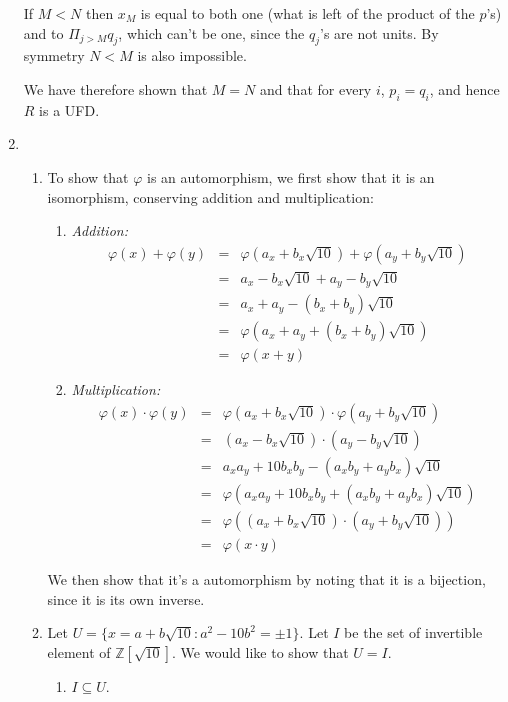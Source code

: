\documentclass[11pt]{article} \usepackage{amssymb}
\newcommand{\Z}{\mathbb Z} \newcommand{\CalE}{{\mathcal{E}}}
\renewcommand{\phi}{\varphi}
\begin{document}
\begin{enumerate}
    If $M<N$ then $x_M$ is equal to both one (what is left of the product
    of the $p$'s) and to $\Pi_{j>M}q_j$, which can't be one, since the $q_j$'s 
    are not units. By symmetry $N<M$ is also impossible.

    We have therefore shown that $M=N$ and that for every $i$, $p_i=q_i$, and
    hence $R$ is a UFD.

  \item
    \begin{enumerate}
      \item To show that $\phi$ is an automorphism, we first show that it
        is an isomorphism,
        conserving addition and multiplication:
        \begin{enumerate}
          \item {\em Addition:} 
            \begin{eqnarray*}
              \phi(x)+\phi(y)&=& \phi(a_x+b_x\sqrt{10})+\phi(a_y+b_y\sqrt{10})
              \\ &=& a_x-b_x\sqrt{10}+a_y-b_y\sqrt{10}
              \\ &=& a_x+a_y-(b_x+b_y)\sqrt{10}
              \\ &=& \phi(a_x+a_y+(b_x+b_y)\sqrt{10})
              \\ &=& \phi(x+y)
            \end{eqnarray*}
          \item {\em Multiplication:} 
            \begin{eqnarray*}
              \phi(x)\cdot\phi(y)
              &=& \phi(a_x+b_x\sqrt{10})\cdot\phi(a_y+b_y\sqrt{10})
              \\ &=& (a_x-b_x\sqrt{10})\cdot(a_y-b_y\sqrt{10})
              \\ &=& a_xa_y+10b_xb_y-(a_xb_y+a_yb_x)\sqrt{10}
              \\ &=& \phi(a_xa_y+10b_xb_y+(a_xb_y+a_yb_x)\sqrt{10})
              \\ &=& \phi((a_x+b_x\sqrt{10})\cdot(a_y+b_y\sqrt{10}))
              \\ &=& \phi(x\cdot y)
            \end{eqnarray*}
        \end{enumerate}
        We then show that it's a automorphism by noting that it is a bijection,
        since it is its own inverse.
      \item 
        Let $U=\{x=a+b\sqrt{10}:a^2-10b^2=\pm1\}$. Let $I$ be the set of invertible
        element of $\Z[\sqrt{10}]$. We would like to show that $U=I$.
        \begin{enumerate}
          \item $I \subseteq U$.


\end{enumerate}
\end{enumerate}
\end{enumerate}
\end{document}

